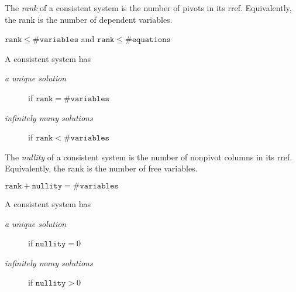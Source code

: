\documentclass[12pt]{article}
\begin{document}
\begin{samepage}
  \begin{definition}
    The \emph{rank} of a consistent system is the number of pivots in its
    rref. Equivalently, the rank is the number of dependent variables.
  \end{definition}
\end{samepage}


\begin{samepage}
  \begin{thm}
    $\mathtt{rank}\leq\#\mathtt{variables}$ and
    $\mathtt{rank}\leq\#\mathtt{equations}$
  \end{thm}
\end{samepage}


\begin{samepage}
  \begin{thm}
    A consistent system has
    \begin{description}
    \item[\emph{a unique solution}] if $\mathtt{rank}=\#\mathtt{variables}$
    \item[\emph{infinitely many solutions}] if
      $\mathtt{rank}<\#\mathtt{variables}$
    \end{description}
  \end{thm}
\end{samepage}


\begin{samepage}
  \begin{definition}
    The \emph{nullity} of a consistent system is the number of nonpivot columns
    in its rref. Equivalently, the rank is the number of free variables.
  \end{definition}
\end{samepage}


\begin{samepage}
  \begin{thm}
    $\mathtt{rank}+\mathtt{nullity}=\#\mathtt{variables}$
  \end{thm}
\end{samepage}


\begin{samepage}
  \begin{thm}
    A consistent system has
    \begin{description}
    \item[\emph{a unique solution}] if $\mathtt{nullity}=0$
    \item[\emph{infinitely many solutions}] if $\mathtt{nullity}>0$
    \end{description}
  \end{thm}
\end{samepage}
\end{document}
